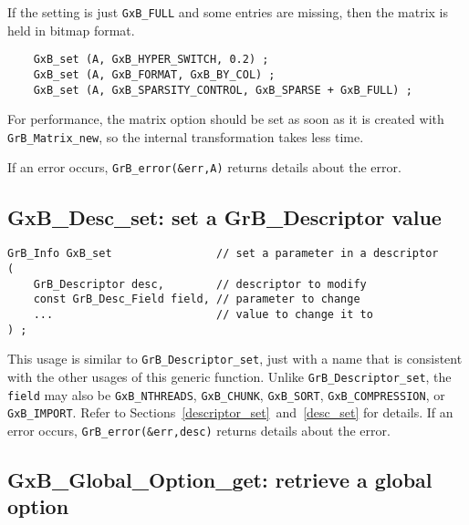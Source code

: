 \documentclass[12pt]{article}
\begin{document}
If the setting is just \verb'GxB_FULL' and some entries are missing, then
the matrix is held in bitmap format.

{\footnotesize
\begin{verbatim}
    GxB_set (A, GxB_HYPER_SWITCH, 0.2) ;
    GxB_set (A, GxB_FORMAT, GxB_BY_COL) ;
    GxB_set (A, GxB_SPARSITY_CONTROL, GxB_SPARSE + GxB_FULL) ;
\end{verbatim} }

For performance, the matrix option should be set as soon as it is created with
\verb'GrB_Matrix_new', so the internal transformation takes less time.

If an error occurs, \verb'GrB_error(&err,A)' returns details about the error.

\subsection{{\sf GxB\_Desc\_set:} set a {\sf GrB\_Descriptor} value}
\label{gxbset}

\begin{mdframed}[userdefinedwidth=6in]
{\footnotesize
\begin{verbatim}
GrB_Info GxB_set                // set a parameter in a descriptor
(
    GrB_Descriptor desc,        // descriptor to modify
    const GrB_Desc_Field field, // parameter to change
    ...                         // value to change it to
) ;
\end{verbatim} } \end{mdframed}

This usage is similar to \verb'GrB_Descriptor_set', just with a name that is
consistent with the other usages of this generic function.  Unlike
\verb'GrB_Descriptor_set', the \verb'field' may also be \verb'GxB_NTHREADS',
\verb'GxB_CHUNK', \verb'GxB_SORT', \verb'GxB_COMPRESSION', or
\verb'GxB_IMPORT'.  Refer to Sections~\ref{descriptor_set}~and~\ref{desc_set}
for details.  If an error occurs, \verb'GrB_error(&err,desc)' returns details
about the error.

\newpage
\subsection{{\sf GxB\_Global\_Option\_get:} retrieve a global option}
\label{gxbget}
\end{document}
